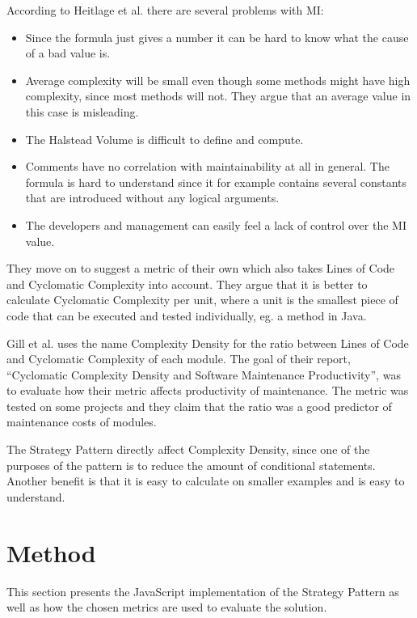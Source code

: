 \documentclass[conference, a4paper]{IEEEtran}
\begin{document}
According to Heitlage et al. there are several problems with MI:
	\begin{itemize}
		\item Since the formula just gives a number it can be hard to know what the cause of a bad value is.
		\item Average complexity will be small even though some methods might have high complexity, since most methods will not. They argue that an average value in this case is misleading.
		\item The Halstead Volume is difficult to define and compute.
		\item Comments have no correlation with maintainability at all in general. The formula is hard to understand since it for example contains several constants that are introduced without any logical arguments.
		\item The developers and management can easily feel a lack of control over the MI value.
	\end{itemize}
They move on to suggest a metric of their own which also takes Lines of Code and Cyclomatic Complexity into account. They argue that it is better to calculate Cyclomatic Complexity per unit, where a unit is the smallest piece of code that can be executed and tested individually, eg. a method in Java.~\cite{bibitem:Maintainability}

Gill et al. uses the name Complexity Density for the ratio between Lines of Code and Cyclomatic Complexity of each module. The goal of their report, ``Cyclomatic Complexity Density and Software Maintenance Productivity'', was to evaluate how their metric affects productivity of maintenance. The metric was tested on some projects and they claim that the ratio was a good predictor of maintenance costs of modules.~\cite{bibitem:CCD}

The Strategy Pattern directly affect Complexity Density, since one of the purposes of the pattern is to reduce the amount of conditional statements. Another benefit is that it is easy to calculate on smaller examples and is easy to understand.

\section{Method}
This section presents the JavaScript implementation of the Strategy Pattern as well as how the chosen metrics are used to evaluate the solution.
\end{document}
